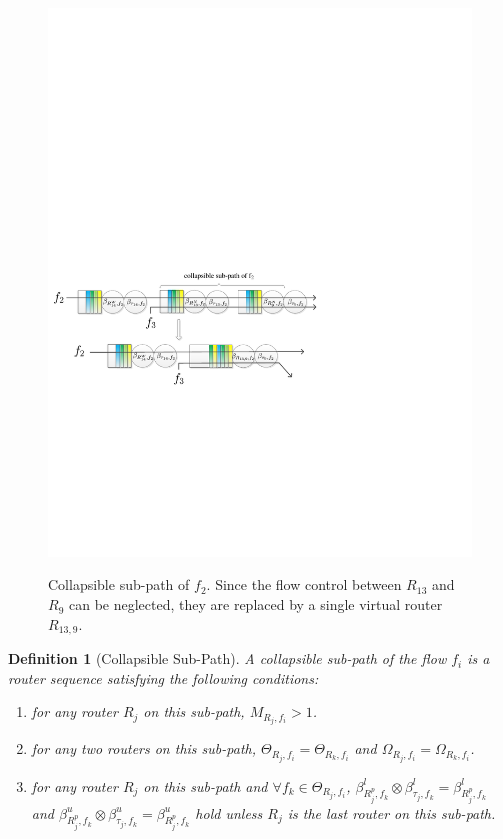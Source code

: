 \documentclass[10pt,journal]{IEEEtran}
\newtheorem{definition}{Definition}
\begin{document}
\begin{figure}
  \centering
  \includegraphics[scale=0.6]{figures/collapse.pdf}\\
  \caption{Collapsible sub-path of $f_2$. Since the flow control between $R_{13}$ and $R_9$ can be neglected, they are replaced by a single virtual router $R_{13,9}$.}\label{collapse}
\end{figure}

\begin{definition}[Collapsible Sub-Path]
A collapsible sub-path of the flow $f_i$ is a router sequence satisfying the following conditions:
\begin{enumerate}
  \item for any router $R_j$ on this sub-path, $M_{R_j,f_i}>1$.
  \item for any two routers on this sub-path, $\Theta_{R_j,f_i}=\Theta_{R_k,f_i}$ and $\Omega_{R_j,f_i}=\Omega_{R_k,f_i}$.
  \item for any router $R_j$ on this sub-path and $\forall f_k\in\Theta_{R_j,f_i}$, $\beta_{R_{j}^{p},f_k}^l\otimes\beta_{\tau_{j},f_k}^l=\beta_{R_{j}^{p},f_k}^l$ and $\beta_{R_{j}^{p},f_k}^u\otimes\beta_{\tau_{j},f_k}^u=\beta_{R_{j}^{p},f_k}^u$ hold unless $R_j$ is the last router on this sub-path.
\end{enumerate}
\end{definition}
\end{document}
